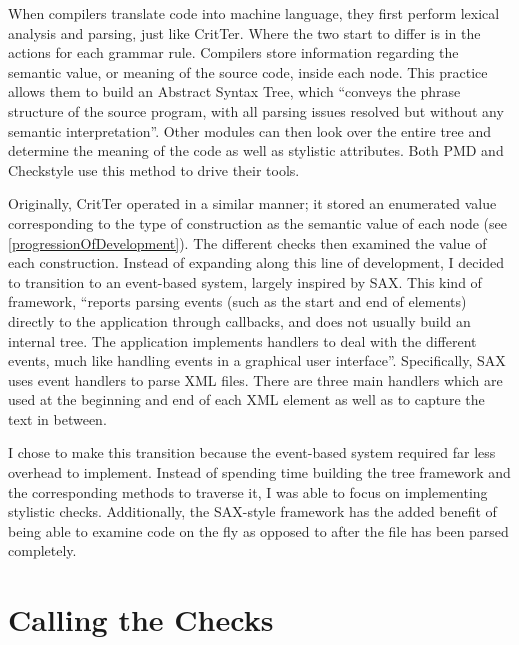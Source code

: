 \documentclass[12pt]{report}
\newcommand{\programName}{CritTer\xspace}
\begin{document}
When compilers translate code into machine language, they first perform lexical analysis and parsing, 
just like \programName. Where the two start to differ is in the actions for each grammar rule. Compilers 
store information regarding the semantic value, or meaning of the source code, inside each node. This 
practice allows them to build an Abstract Syntax Tree, which ``conveys the phrase structure of the source 
program, with all parsing issues resolved but without any semantic 
interpretation''\cite{compiler-implementation}. Other modules can then look over the entire tree and 
determine the meaning of the code as well as stylistic attributes. Both PMD and Checkstyle use this 
method to drive their tools. 

Originally, \programName operated in a similar manner; it stored an enumerated value corresponding to 
the type of construction as the semantic value of each node (see \autoref{progressionOfDevelopment}). 
The different checks then examined the value of each construction. Instead of expanding along this line 
of development, I decided to transition to an event-based system, largely inspired by 
SAX\cite{saxHomepage}. This kind of framework, ``reports parsing events (such as the start and end of 
elements) directly to the application through callbacks, and does not usually build an internal tree. The 
application implements handlers to deal with the different events, much like handling events in a 
graphical user interface''\cite{saxHomepage}. Specifically, SAX uses event handlers to parse XML files. 
There are three main handlers which are used at the beginning and end of each XML element as well as 
to capture the text in between. 

I chose to make this transition because the event-based system required far less overhead to 
implement. Instead of spending time building the tree framework and the corresponding methods to 
traverse it, I was able to focus on implementing stylistic checks. Additionally, the SAX-style framework 
has the added benefit of being able to examine code on the fly as opposed to after the file has been 
parsed completely.

\section{Calling the Checks}
\label{callingTheChecks}
\end{document}
